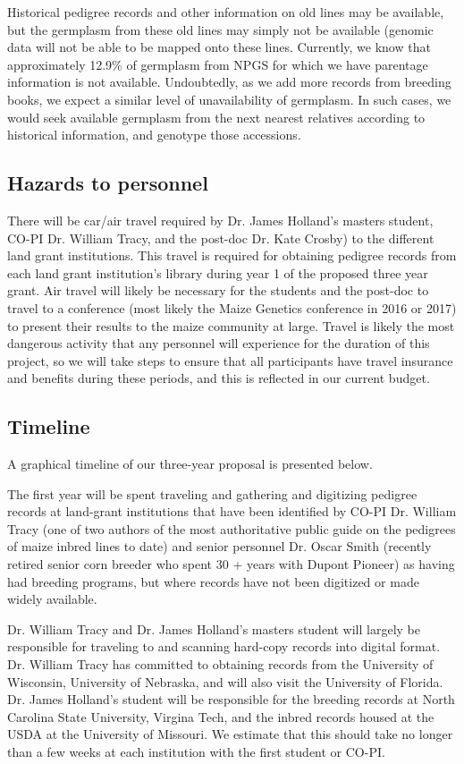 \documentclass[12pt]{article}
\begin{document}
Historical pedigree records and other information on old lines may be available, but the germplasm from these old lines may simply not be available (genomic data will not be able to be mapped onto these lines. Currently, we know that approximately 12.9\% of germplasm from NPGS for which we have parentage information is not available. Undoubtedly, as we add more records from breeding books, we expect a similar level of unavailability of germplasm.  In such cases, we would seek available germplasm from the next nearest relatives according to historical information, and genotype those accessions. 


\subsection*{Hazards to personnel}
There will be car/air travel required by Dr. James Holland's masters student, CO-PI Dr. William Tracy, and the post-doc Dr. Kate Crosby) to the different land grant institutions. 
This travel is required for obtaining pedigree records from each land grant institution's library during year 1 of the proposed three year grant. Air travel will likely be necessary for the students and the post-doc to travel to a conference (most likely the Maize Genetics conference in 2016 or 2017) to present their results to the maize community at large. Travel is likely the most dangerous activity that any personnel will experience for the duration of this project, so we will take steps to ensure that all participants have travel insurance and benefits during these periods, and
this is reflected in our current budget. 


\subsection*{Timeline}
A graphical timeline of our three-year proposal is presented below.

The first year will be spent traveling and gathering and digitizing pedigree records at land-grant institutions that have been identified by CO-PI Dr. William Tracy (one of two authors of the most authoritative public guide on the pedigrees of maize inbred lines to date) and senior personnel Dr. Oscar Smith (recently retired senior corn breeder who spent 30 + years with Dupont Pioneer) as having had breeding programs, but where records have not been digitized or made widely available. 

Dr. William Tracy and Dr. James Holland's masters student will largely be responsible for traveling to and scanning hard-copy records into digital format. Dr. William Tracy has committed to obtaining records from the University of Wisconsin, University of Nebraska, and will also visit the University of Florida. 
Dr. James Holland's student will be responsible for the breeding records at North Carolina State University, Virgina Tech, and the inbred records housed at the USDA at the University of Missouri. We estimate that this should take no longer than a few weeks at each institution with the first student or CO-PI. 
\end{document}
